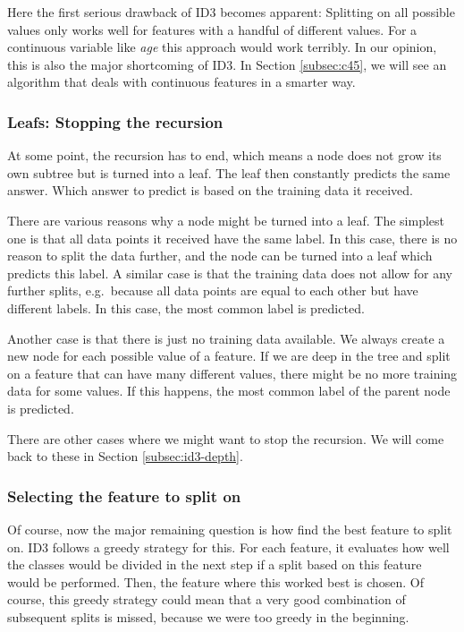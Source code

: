 \documentclass[a4paper]{article}
\begin{document}
Here the first serious drawback of ID3 becomes apparent: Splitting on all possible values only works well for features with a handful of different values. For a continuous variable like \emph{age} this approach would work terribly. In our opinion, this is also the major shortcoming of ID3. In Section \ref{subsec:c45}, we will see an algorithm that deals with continuous features in a smarter way.

\subsubsection{Leafs: Stopping the recursion}

At some point, the recursion has to end, which means a node does not grow its own subtree but is turned into a leaf. The leaf then constantly predicts the same answer. Which answer to predict is based on the training data it received.

There are various reasons why a node might be turned into a leaf. The simplest one is that all data points it received have the same label. In this case, there is no reason to split the data further, and the node can be turned into a leaf which predicts this label. A similar case is that the training data does not allow for any further splits, e.g.\ because all data points are equal to each other but have different labels. In this case, the most common label is predicted.

Another case is that there is just no training data available. We always create a new node for each possible value of a feature. If we are deep in the tree and split on a feature that can have many different values, there might be no more training data for some values. If this happens, the most common label of the parent node is predicted.

There are other cases where we might want to stop the recursion. We will come back to these in Section \ref{subsec:id3-depth}.

\subsubsection{Selecting the feature to split on}

Of course, now the major remaining question is how find the best feature to split on. ID3 follows a greedy strategy for this. For each feature, it evaluates how well the classes would be divided in the next step if a split based on this feature would be performed. Then, the feature where this worked best is chosen. Of course, this greedy strategy could mean that a very good combination of subsequent splits is missed, because we were too greedy in the beginning.
\end{document}
